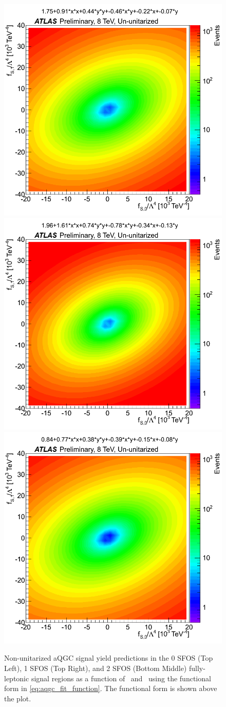 \begin{figure}[tb]
\centering
\includegraphics[width=.495\textwidth]{figures/aqgc_fits/0SFOS/3lUnUnit_0SFOS.png}
\includegraphics[width=.495\textwidth]{figures/aqgc_fits/1SFOS/3lUnUnit_1SFOS.png}
\includegraphics[width=.495\textwidth]{figures/aqgc_fits/2SFOS/3lUnUnit_2SFOS.png}
\caption{Non-unitarized aQGC signal yield predictions in the 0 SFOS (Top Left), 
1 SFOS (Top Right), and 2 SFOS (Bottom Middle) fully-leptonic signal regions
as a function of \fszero~and \fsone~using the functional
form in \eqn\eqref{eq:aqgc_fit_function}. The functional form is shown
above the plot.}
\label{fig:aqgc_fit_3l_ununit}
\end{figure}

